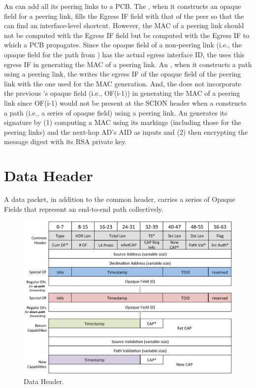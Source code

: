 An \AD can add all its peering links to a PCB. The \BS, when it constructs an opaque field for a peering link, fills the Egress IF field with that of the peer so that the \STUB \AD can find an interface-level shortcut. However, the MAC of a peering link should not be computed with the Egress IF field but be computed with the Egress IF to which a PCB propagates. Since the opaque field of a non-peering link (i.e., the opaque field for the path from \ISDC) has the actual egress interface ID, the \BS uses this egress IF in generating the MAC of a peering link. An \STUB \AD, when it constructs a path using a peering link, the \AD writes the egress IF of the opaque field of the peering link with the one used for the MAC generation. And, the \BS does not incorporate the previous \AD's opaque field (i.e., OF(i-1)) in generating the MAC of a peering link since OF(i-1) would not be present at the SCION header when a \STUB \AD constructs a path (i.e., a series of opaque field) using a peering link. An \AD generates its signature by (1) computing a MAC using its markings (including those for the peering links) and the next-hop AD's AID as inputs and (2) then encrypting the message digest with its RSA private key.

\section{Data Header}\label{subsec:data-header}
A data packet, in addition to the common header, carries a series of Opaque Fields that represent an end-to-end path collectively.

\begin{figure}[ht]
\centering
\includegraphics[width=.9\columnwidth]{./fig/nhdr_data.eps}
\caption{Data Header.}\label{fig:hdr-data}
\end{figure}

